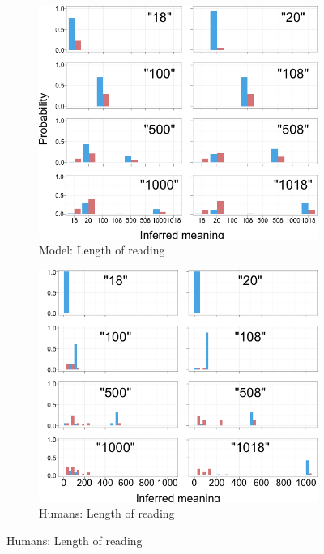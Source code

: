 \documentclass{article} %
\begin{document}
\begin{figure}[H]
        \qquad
        
       
       \begin{subfigure}[b]{0.51\textwidth}
                \centering
                \caption{Model: Length of reading}
                \includegraphics[width=\textwidth]{model_reading_all.png}
	\end{subfigure}
        \begin{subfigure}[b]{0.51\textwidth}
                \centering       
                \caption{Humans: Length of reading}         
                \includegraphics[width=\textwidth]{humans_reading_all.png}

\end{subfigure}
\end{figure}
\end{document}
